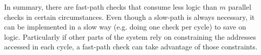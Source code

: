 In summary, there are fast-path checks that consume less logic than $m$ parallel checks in certain circumstances.
Even though a slow-path is always necessary, it can be implemented in a slow way (e.g. doing one check per cycle) to save on logic.
Particularly if other parts of the system rely on constraining the addresses accessed in each cycle, a fast-path check can take advantage of those constraints. 